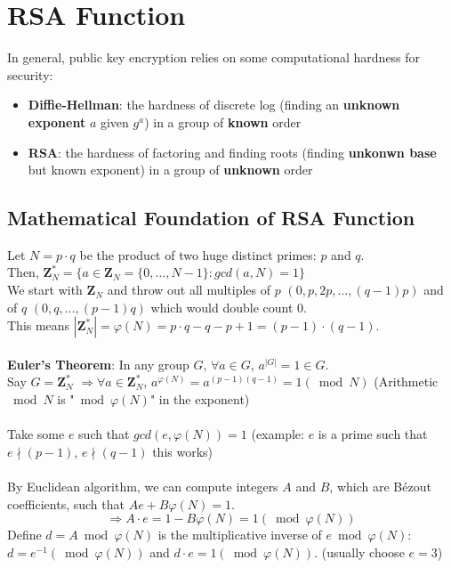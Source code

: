 \documentclass{scribe}
\begin{document}
\maketitle


\section{RSA Function}
In general, public key encryption relies on some computational hardness for security:
\begin{itemize}
    \item \textbf{Diffie-Hellman}: the hardness of discrete log (finding an \textbf{unknown exponent} $a$ given $g^a$) in a group of \textbf{known} order
    \item \textbf{RSA}: the hardness of factoring and finding roots (finding \textbf{unkonwn base} but known exponent) in a group of \textbf{unknown} order
\end{itemize}

\subsection{Mathematical Foundation of RSA Function}
Let $N = p \cdot q$ be the product of two huge distinct primes: $p$ and $q$.
\\
Then, $\mathbf{Z}_N^* = \{a \in \mathbf{Z}_N = \{0, \dots, N-1\}: gcd(a,N) =1\}$
\\
We start with $\mathbf{Z}_N$ and throw out all multiples of $p$ $(0,p,2p, \dots ,(q-1)p)$ and of $q$ $(0,q, \dots, (p-1)q)$ which would double count 0. 
\\
This means $|\mathbf{Z}_N^*| = \varphi(N) = p \cdot q - q -p +1 = (p-1)\cdot (q-1)$.
\\\\
\textbf{Euler's Theorem}: In any group $G$, $\forall  a \in G$, $a^{|G|} = 1 \in G$. 
\\Say $G = \mathbf{Z}_N^*$ $\Rightarrow \forall a \in \mathbf{Z}_N^*$, $a^{\varphi(N)}=a^{(p-1)(q-1)} = 1 (\bmod N)$ 
(Arithmetic  $\bmod N$ is "$ \bmod \varphi(N)$" in the exponent)
\\\\
Take some $e$ such that $gcd(e,\varphi(N)) = 1$ (example: $e$ is a prime such that $e \nmid (p-1)$, $e \nmid (q-1)$ this works)
\\\\
By Euclidean algorithm, we can compute integers $A$ and $B$, which are B\'{e}zout coefficients, such that $Ae+B\varphi(N) = 1$.
\\
\[\Rightarrow A \cdot e = 1 - B \varphi(N) = 1 (\bmod \varphi(N))\]
Define $d = A \bmod \varphi(N)$ is the multiplicative inverse of $e \bmod \varphi(N)$: $d=e^{-1} (\bmod \varphi(N))$ and $d \cdot e = 1 (\bmod \varphi(N))$. (usually choose $e=3$)
\vspace{10mm}
\end{document}

